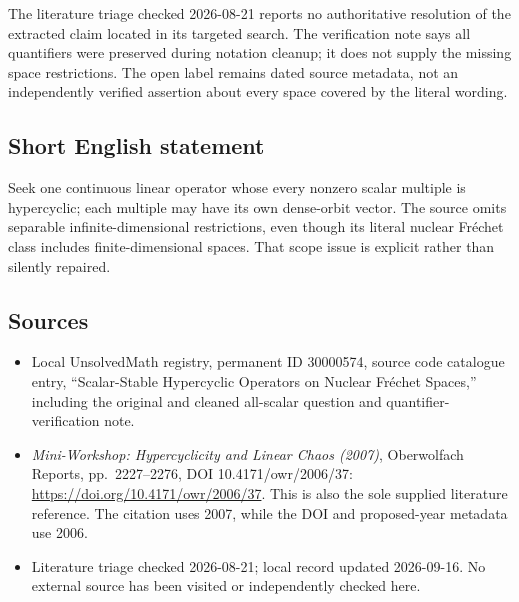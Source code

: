\documentclass[11pt]{article}
\begin{document}
The literature triage checked 2026-08-21 reports no authoritative resolution of the extracted claim located in its targeted search. The verification note says all quantifiers were preserved during notation cleanup; it does not supply the missing space restrictions. The open label remains dated source metadata, not an independently verified assertion about every space covered by the literal wording.
\subsection{Short English statement}
Seek one continuous linear operator whose every nonzero scalar multiple is hypercyclic; each multiple may have its own dense-orbit vector. The source omits separable infinite-dimensional restrictions, even though its literal nuclear Fr\'echet class includes finite-dimensional spaces. That scope issue is explicit rather than silently repaired.
\subsection{Sources}
\begin{itemize}
\item Local UnsolvedMath registry, permanent ID 30000574, source code catalogue entry, ``Scalar-Stable Hypercyclic Operators on Nuclear Fr\'echet Spaces,'' including the original and cleaned all-scalar question and quantifier-verification note.
\item \emph{Mini-Workshop: Hypercyclicity and Linear Chaos (2007)}, Oberwolfach Reports, pp.\ 2227--2276, DOI 10.4171/owr/2006/37: \url{https://doi.org/10.4171/owr/2006/37}. This is also the sole supplied literature reference. The citation uses 2007, while the DOI and proposed-year metadata use 2006.
\item Literature triage checked 2026-08-21; local record updated 2026-09-16. No external source has been visited or independently checked here.
\end{itemize}
\end{document}
